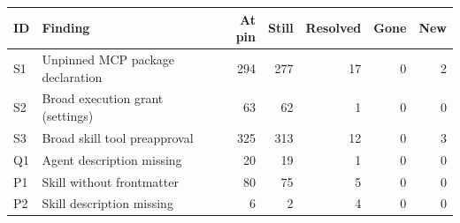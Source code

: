 \begin{tabular}{@{}llrrrrr@{}}
\toprule
ID & Finding & At pin & Still & Resolved & Gone & New \\
\midrule
S1 & Unpinned MCP package declaration & 294 & 277 & 17 & 0 & 2 \\
S2 & Broad execution grant (settings) & 63 & 62 & 1 & 0 & 0 \\
S3 & Broad skill tool preapproval & 325 & 313 & 12 & 0 & 3 \\
Q1 & Agent description missing & 20 & 19 & 1 & 0 & 0 \\
P1 & Skill without frontmatter & 80 & 75 & 5 & 0 & 0 \\
P2 & Skill description missing & 6 & 2 & 4 & 0 & 0 \\
\bottomrule
\end{tabular}
